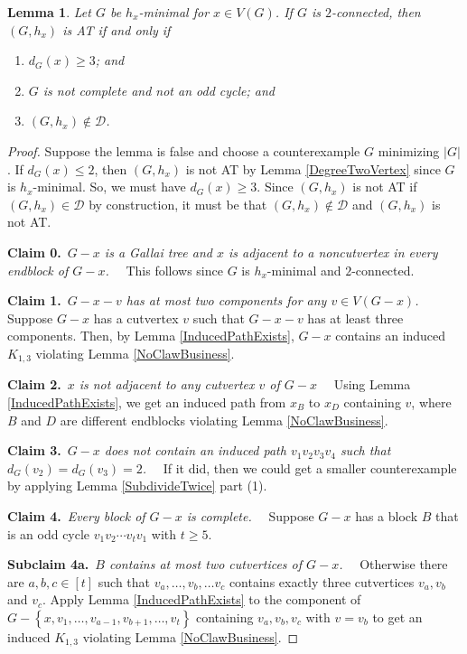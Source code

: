 \documentclass[12pt]{article}
\theoremstyle{plain}
\newtheorem{lem}[thm]{Lemma}
\theoremstyle{definition}
\theoremstyle{remark}
\newcommand{\fancy}[1]{\mathcal{#1}}
\newcommand{\D}{\fancy{D}}
\newcommand{\set}[1]{\left\{ #1 \right\}}
\newcommand{\card}[1]{\left|#1\right|}
\newcommand{\irange}[1]{\left[#1\right]}
\def\D{\fancy{D}}
\newcommand{\claim}[2]{{\bf Claim #1.}~{\it #2}~~}
\newcommand{\subclaim}[2]{{\bf Subclaim #1.}~{\it #2}~~}
\begin{document}
\begin{lem}
	Let $G$ be $h_x$-minimal for $x \in V(G)$.  If $G$ is $2$-connected, then $(G,h_x)$ is AT if and only if 
	\begin{enumerate}
		\item $d_G(x) \ge 3$; and
		\item $G$ is not complete and not an odd cycle; and
		\item $(G,h_x) \not \in \D$.
	\end{enumerate}
\end{lem}
\begin{proof}
	Suppose the lemma is false and choose a counterexample $G$ minimizing $\card{G}$.  If $d_G(x) \le 2$, then $(G,h_x)$ is not AT by Lemma \ref{DegreeTwoVertex} since $G$ is $h_x$-minimal.  So, we must have $d_G(x) \ge 3$.  Since $(G,h_x)$ is not AT if $(G,h_x) \in \D$ by construction, it must be that $(G,h_x) \not \in \D$ and $(G,h_x)$ is not AT.   
	
	\claim{0}{$G-x$ is a Gallai tree and $x$ is adjacent to a noncutvertex in every endblock of $G-x$.}
	 This follows since $G$ is $h_x$-minimal and $2$-connected.
	
	 \claim{1}{$G-x-v$ has at most two components for any $v \in V(G-x)$.}
      Suppose $G-x$ has a cutvertex $v$ such that $G-x-v$ has at least three components.  Then, by Lemma \ref{InducedPathExists}, $G-x$ contains an induced $K_{1,3}$ violating Lemma \ref{NoClawBusiness}.
      
     \claim{2}{$x$ is not adjacent to any cutvertex $v$ of $G-x$}
      Using Lemma \ref{InducedPathExists}, we get an induced path from $x_B$ to $x_D$ containing $v$, where $B$ and $D$ are different endblocks violating Lemma \ref{NoClawBusiness}.
      
     \claim{3}{$G-x$ does not contain an induced path $v_1v_2v_3v_4$ such that $d_G(v_2) = d_G(v_3) = 2$.}
      If it did, then we could get a smaller counterexample by applying Lemma \ref{SubdivideTwice} part (1).
      
     \claim{4}{Every block of $G-x$ is complete.}
      Suppose $G-x$ has a block $B$ that is an odd cycle $v_1v_2\cdots v_tv_1$ with $t \ge 5$.
      
      \subclaim{4a}{$B$ contains at most two cutvertices of $G-x$.}
	  Otherwise there are $a,b,c \in \irange{t}$ such that $v_a, \ldots, v_b, \ldots v_c$ contains exactly three cutvertices $v_a, v_b$ and $v_c$.  Apply Lemma \ref{InducedPathExists} to the component of $G-\set{x,v_1, \ldots, v_{a-1}, v_{b+1}, \ldots, v_t}$ containing $v_a, v_b, v_c$ with $v = v_b$ to get an induced $K_{1,3}$ violating Lemma \ref{NoClawBusiness}. 
	  

\end{proof}
\end{document}
